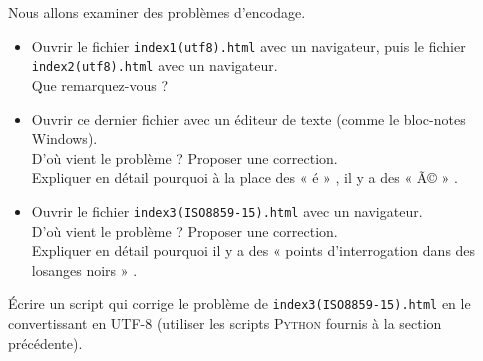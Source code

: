 \begin{exercice} Nous allons examiner des problèmes d'encodage.
    \begin{itemize}
        \item Ouvrir le fichier \texttt{index1(utf8).html} avec un navigateur, puis le fichier \texttt{index2(utf8).html} avec un navigateur.\\
              Que remarquez-vous ?\\

        \item 	Ouvrir ce dernier fichier avec un éditeur de texte (comme le bloc-notes Windows).\\
              D'où vient le problème ? Proposer une correction.\\
              Expliquer en détail pourquoi à la place des « é » , il y a des « Ã© »  .\\

        \item 	Ouvrir le fichier \texttt{index3(ISO8859-15).html} avec un navigateur.\\
              D'où vient le problème ? Proposer une correction.\\
              Expliquer en détail pourquoi il y a des « points d'interrogation dans des losanges noirs » .\\
    \end{itemize}
\end{exercice}

\begin{exercice}
    \'Ecrire un script qui corrige le problème de  \texttt{index3(ISO8859-15).html} en le convertissant en UTF-8 (utiliser les scripts \textsc{Python} fournis à la section précédente).

\end{exercice}